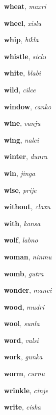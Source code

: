 \documentclass[12pt]{book}
\begin{document}
\begin{description}
\item[ ] \textbf{wheat}, \textit{maxri}

\item[ ] \textbf{wheel}, \textit{xislu}

\item[ ] \textbf{whip}, \textit{bikla}

\item[ ] \textbf{whistle}, \textit{siclu}

\item[ ] \textbf{white}, \textit{blabi}

\item[ ] \textbf{wild}, \textit{cilce}

\item[ ] \textbf{window}, \textit{canko}

\item[ ] \textbf{wine}, \textit{vanju}

\item[ ] \textbf{wing}, \textit{nalci}

\item[ ] \textbf{winter}, \textit{dunra}

\item[ ] \textbf{win}, \textit{jinga}

\item[ ] \textbf{wise}, \textit{prije}

\item[ ] \textbf{without}, \textit{claxu}

\item[ ] \textbf{with}, \textit{kansa}

\item[ ] \textbf{wolf}, \textit{labno}

\item[ ] \textbf{woman}, \textit{ninmu}

\item[ ] \textbf{womb}, \textit{gutra}

\item[ ] \textbf{wonder}, \textit{manci}

\item[ ] \textbf{wood}, \textit{mudri}

\item[ ] \textbf{wool}, \textit{sunla}

\item[ ] \textbf{word}, \textit{valsi}

\item[ ] \textbf{work}, \textit{gunka}

\item[ ] \textbf{worm}, \textit{curnu}

\item[ ] \textbf{wrinkle}, \textit{cinje}

\item[ ] \textbf{write}, \textit{ciska}



\end{description}
\end{document}

